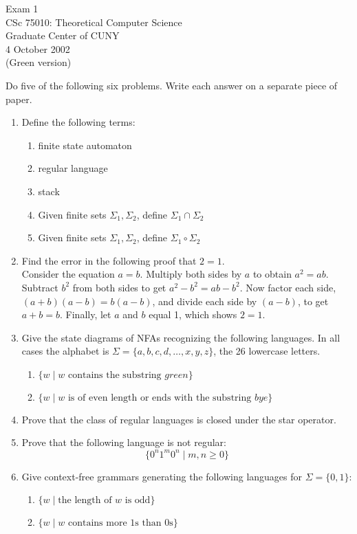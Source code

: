 \documentclass[11pt]{article}
\begin{document}
\begin{center}
	Exam 1\\
        	CSc 75010: Theoretical Computer Science\\
        	Graduate Center of CUNY\\
	4 October 2002\\
        	(Green version)
\end{center}

Do five of the following six problems.  Write each answer on a separate
piece of paper.


\begin{enumerate}
	\item Define the following terms:
     	   \begin{enumerate}
		\item finite state automaton
		\item regular language
		\item stack
		\item Given finite sets $\Sigma_1, \Sigma_2$, 
			define $\Sigma_1 \cap \Sigma_2$
		\item Given finite sets $\Sigma_1, \Sigma_2$, 
			define $\Sigma_1 \circ \Sigma_2$
	   \end{enumerate}
   	\item Find the error in the following proof that $2=1$.\\
		Consider the equation $a=b$.  Multiply both sides by $a$ to obtain $a^2 = ab$.
		Subtract $b^2$ from both sides to get $a^2-b^2 = ab-b^2$.  Now factor each 
		side, $(a+b)(a-b) = b(a-b)$, and divide each side by $(a-b)$, to get $a+b=b$.
		Finally, let $a$ and $b$ equal 1, which shows $2=1$.
   	\item Give the state diagrams of NFAs recognizing the following languages.  In all
	    cases the alphabet is $\Sigma = \{a,b,c,d,\ldots,x,y,z\}$, the 26 lowercase letters.
	    \begin{enumerate}
		\item $\{w \mid w \mbox{ contains the substring $green$}\}$
		\item $\{w \mid w \mbox{ is of even length or ends with the substring $bye$}\}$
	    \end{enumerate}
   	\item Prove that the class of regular languages is closed under the star operator.
   	\item Prove that the following language is not regular:
		$$
			\{ 0^n 1^m 0^n \mid m,n \geq 0\}
		$$
   	\item Give context-free grammars generating the following languages for 
		$\Sigma = \{0,1\}$:
	  \begin{enumerate}
		\item $\{w \mid \mbox{the length of $w$ is odd}\}$
		\item $\{w \mid \mbox{$w$ contains more $1$s than $0$s}\}$
	  \end{enumerate}
\end{enumerate}



 
\end{document}
